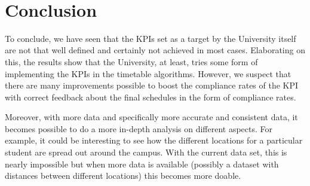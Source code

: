 ~
\section{Conclusion}
To conclude, we have seen that the KPIs set as a target by the University itself are not that well defined and certainly not achieved in most cases. Elaborating on this, the results show that the University, at least, tries some form of implementing the KPIs in the timetable algorithms. However, we suspect that there are many improvements possible to boost the compliance rates of the KPI with correct feedback about the final schedules in the form of compliance rates.

Moreover, with more data and specifically more accurate and consistent data, it becomes possible to do a more in-depth analysis on different aspects. For example, it could be interesting to see how the different locations for a particular student are spread out around the campus. With the current data set, this is nearly impossible but when more data is available (possibly a dataset with distances between different locations) this becomes more doable.